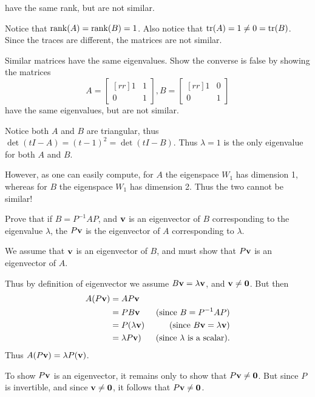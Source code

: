 have the same rank, but are not similar.
\\
\begin{solution}Notice that $\operatorname{rank}(A) = \operatorname{rank}(B) = 1$. Also notice that $\operatorname{tr}(A) = 1 \neq 0 = \operatorname{tr}(B)$. Since the traces are different, the matrices are not similar. 
\end{solution}
\ii Similar matrices have the same eigenvalues. Show the converse is false by showing the matrices
$$
A =
\begin{bmatrix}[rr]
1&1\\
0&1
\end{bmatrix}
,
B =
\begin{bmatrix}[rr]
1&0\\
0&1
\end{bmatrix}
$$
have the same eigenvalues, but are not similar.
\\
\begin{solution}
Notice both $A$ and $B$ are triangular, thus $\det(t I - A) = (t - 1)^2 = \det(t I -B)$. Thus $\lambda = 1$ is the only eigenvalue for both $A$ and $B$. 

However, as one can easily compute, for $A$ the eigenspace $W_1$ has dimension 1, whereas for $B$ the eigenspace $W_1$ has dimension 2. Thus the two cannot be similar! 
\end{solution}
\ii Prove that if $B = P^{-1}AP$, and ${\mathbf v}$ is an eigenvector of $B$ corresponding to the eigenvalue $\lambda$, the $P{\mathbf v}$ is the eigenvector of $A$ corresponding to $\lambda$.
\\
\begin{solution}
We assume that ${\mathbf v}$ is an eigenvector of $B$, and must show that $P{\mathbf v}$ is an eigenvector of $A$. 

Thus by definition of eigenvector we assume
\bb[(i)]
\ii $B{\mathbf v}=\lambda\bold v$, and 
\ii ${\mathbf v}\ne{\mathbf 0}$. 
\ee
But then 
\begin{align*}
A(P{\mathbf v})&=AP{\mathbf v}\\
&=PB{\mathbf v} &\text{(since $B=P^{-1}AP$)}\\
&=P(\lambda{\mathbf v}) &\text{ (since $B{\mathbf v}=\lambda{\mathbf v}$)}\\
&=\lambda P{\mathbf v}) &\text{ (since $\lambda$ is a scalar)}.
\end{align*}
Thus $A(P{\mathbf v})=\lambda P({\mathbf v})$. 

To show $P{\mathbf v}$ is an eigenvector, it remains only to show that $P{\mathbf v}\ne{\mathbf 0}$. But since $P$ is invertible, and since ${\mathbf v}\ne{\mathbf 0}$, it follows that $P{\mathbf v}\ne{\mathbf 0}$. 
\end{solution}
